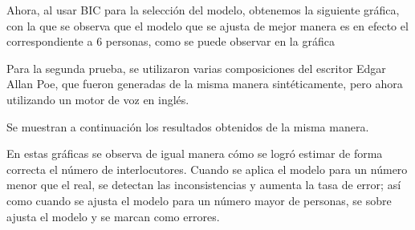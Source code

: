 Ahora, al usar BIC para la selección del modelo, obtenemos la siguiente gráfica, con la que se observa que el modelo que se ajusta de mejor manera es en efecto el correspondiente a 6 personas, como se puede observar en la gráfica 

Para la segunda prueba, se utilizaron varias composiciones del escritor Edgar Allan Poe, que fueron generadas de la misma manera sintéticamente, pero ahora utilizando un motor de voz en inglés.

Se muestran a continuación los resultados obtenidos de la misma manera.

En estas gráficas se observa de igual manera cómo se logró estimar de forma correcta el número de interlocutores. Cuando se aplica el modelo para un número menor que el real, se detectan las inconsistencias y aumenta la tasa de error; así como cuando se ajusta el modelo para un número mayor de personas, se sobre ajusta el modelo y se marcan como errores.

